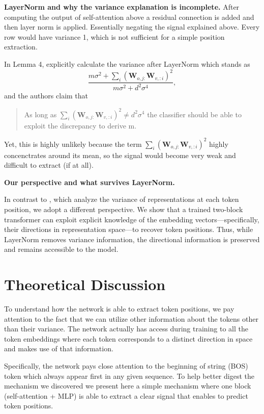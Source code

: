 \documentclass{article}
\theoremstyle{plain}
\theoremstyle{definition}
\theoremstyle{remark}
\begin{document}
\textbf{LayerNorm and why the variance explanation is incomplete.} After computing the output of self-attention above a residual connection is added and then layer norm is applied. Essentially negating the signal explained above. Every row would have variance 1, which is not sufficient for a simple position extraction.

In Lemma 4, \cite{chi-etal-2023-latent} explicitly calculate the variance after LayerNorm which stands as 
\[
\frac{ m\sigma^2 + \sum_i \left( \mathbf{W}_{o,j:}\mathbf{W}_{v,:i} \right)^2 }
     { m\sigma^2 + d^2\sigma^4 },
\]
 and the authors claim that \begin{quote}
   As long
as   $\sum_i \left( \mathbf{W}_{o,j:}\mathbf{W}_{v,:i} \right)^2 \neq d^2 \sigma^4$ the classifier should
be able to exploit the discrepancy to derive m.
 \end{quote}

 Yet, this is highly unlikely because the term $ \sum_i \left( \mathbf{W}_{o,j:}\mathbf{W}_{v,:i} \right)^2$ highly concenctrates around its mean, so the signal would become very weak and difficult to extract (if at all).

 
\textbf{Our perspective and what survives LayerNorm.}

In contrast to \citet{chi-etal-2023-latent}, which analyze the variance of representations at each token position, we adopt a different perspective. We show that a trained two-block transformer can exploit explicit knowledge of the embedding vectors—specifically, their directions in representation space—to recover token positions. Thus, while LayerNorm removes variance information, the directional information is preserved and remains accessible to the model.
 
\section{Theoretical Discussion}

To understand how the network is able to extract token positions, we pay attention to the fact that we can utilize other information about the tokens other than their variance. The network actually has access during training to all the token embeddings where each token corresponds to a distinct direction in space and makes use of that  information.


Specifically, the network pays close attention to the beginning of string (BOS) token which always appear first in any given sequence. To help better digest the mechanism we discovered we present here a simple mechanism where one block (self-attention + MLP) is able to extract a clear signal that enables to predict token positions.
\end{document}
